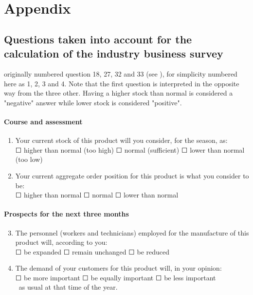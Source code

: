 \documentclass[12pt,a4paper,oneside]{book}
\begin{document}
  
\begin{appendix}
  \listoffigures
  \listoftables
\end{appendix}


\chapter*{Appendix}

\section*{Questions taken into account for the calculation of the industry business survey}
\label{Appendix: Question NS975 description}

originally numbered question 18, 27, 32 and 33 (see ), for simplicity numbered here as 1, 2, 3 and 4.
Note that the first question is interpreted in the opposite way from the three other. Having a higher stock than normal is considered a "negative" answer while lower stock is considered "positive".


\subsubsection*{Course and assessment}
\begin{enumerate}
    \item Your current stock of this product will you consider, for the season, as: \\
    $\Square$ higher than normal (too high) $\Square$ normal (sufficient) $\Square$ lower than normal (too low)
    
    \item Your current aggregate order position for this product is what you consider to be: \\
    $\Square$ higher than normal $\Square$ normal $\Square$ lower than normal
\end{enumerate}

\subsubsection*{Prospects for the next three months} 
\begin{enumerate}
\setcounter{enumi}{2}
    \item The personnel (workers and technicians) employed for the manufacture of this product will, according to you: \\
    $\Square$ be expanded $\Square$ remain unchanged $\Square$ be reduced
                        
    \item The demand of your customers for this product will, in your opinion:  \\
    $\Square$ be more important $\Square$ be equally important $\Square$ be less important \\\    
    as usual at that time of the year.
\end{enumerate}
\end{document}
